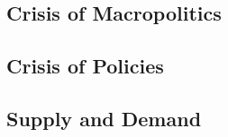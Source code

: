 \subsection{Crisis of Macropolitics}

\subsection{Crisis of Policies}

\subsection{Supply and Demand}




